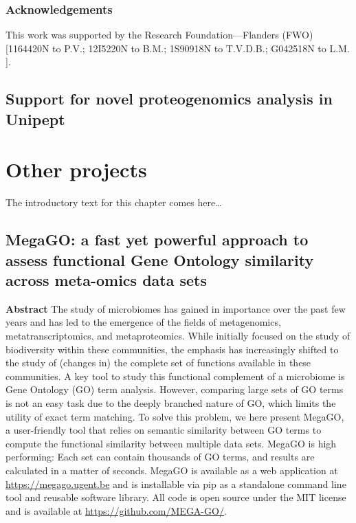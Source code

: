 \hypertarget{acknowledgements-1}{%
\section{Acknowledgements}\label{acknowledgements-1}}

This work was supported by the Research Foundation---Flanders (FWO)
{[}1164420N to P.V.; 12I5220N to B.M.; 1S90918N to T.V.D.B.; G042518N to
L.M. {]}.

\newpage

\hypertarget{support-for-novel-proteogenomics-analysis-in-unipept}{%
\chapter{Support for novel proteogenomics analysis in
Unipept}\label{support-for-novel-proteogenomics-analysis-in-unipept}}


\hypertarget{other-projects}{%
\part{Other projects}\label{other-projects}}

The introductory text for this chapter comes here\ldots{}

\hypertarget{megago-a-fast-yet-powerful-approach-to-assess-functional-gene-ontology-similarity-across-meta-omics-data-sets}{%
\chapter{MegaGO: a fast yet powerful approach to assess functional Gene
Ontology similarity across meta-omics data
sets}\label{megago-a-fast-yet-powerful-approach-to-assess-functional-gene-ontology-similarity-across-meta-omics-data-sets}}


\textbf{Abstract} The study of microbiomes has gained in importance over
the past few years and has led to the emergence of the fields of
metagenomics, metatranscriptomics, and metaproteomics. While initially
focused on the study of biodiversity within these communities, the
emphasis has increasingly shifted to the study of (changes in) the
complete set of functions available in these communities. A key tool to
study this functional complement of a microbiome is Gene Ontology (GO)
term analysis. However, comparing large sets of GO terms is not an easy
task due to the deeply branched nature of GO, which limits the utility
of exact term matching. To solve this problem, we here present MegaGO, a
user-friendly tool that relies on semantic similarity between GO terms
to compute the functional similarity between multiple data sets. MegaGO
is high performing: Each set can contain thousands of GO terms, and
results are calculated in a matter of seconds. MegaGO is available as a
web application at \url{https://megago.ugent.be} and is installable via
pip as a standalone command line tool and reusable software library. All
code is open source under the MIT license and is available at
\url{https://github.com/MEGA-GO/}.

